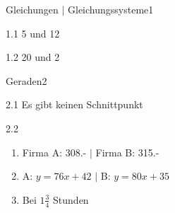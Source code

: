 \begin{solutionseries}[columns=2,solsubrule=\hrule ]{Gleichungen $|$ Gleichungssysteme}{1}
\begin{exsol@solution}{1.1}
    5 und 12
\end{exsol@solution}
\begin{exsol@solution}{1.2}
    20 und 2
\end{exsol@solution}
\end{solutionseries}
\begin{solutionseries}[columns=2]{Geraden}{2}
\begin{exsol@solution}{2.1}
    Es gibt keinen Schnittpunkt
\end{exsol@solution}
\begin{exsol@solution}{2.2}
    \begin{enumerate}[label=\alph*)]
    \item Firma A: 308.- $|$ Firma B: 315.-
    \item A: $y=76x+42$ $|$ B: $y=80x+35$
    \item Bei $1\frac{3}{4}$ Stunden
    \end{enumerate}
\end{exsol@solution}
\end{solutionseries}
